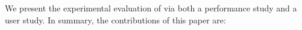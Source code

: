 We present the experimental evaluation of \SeeDB 
via both a performance study and a user study.
In summary, the contributions of this paper are:


